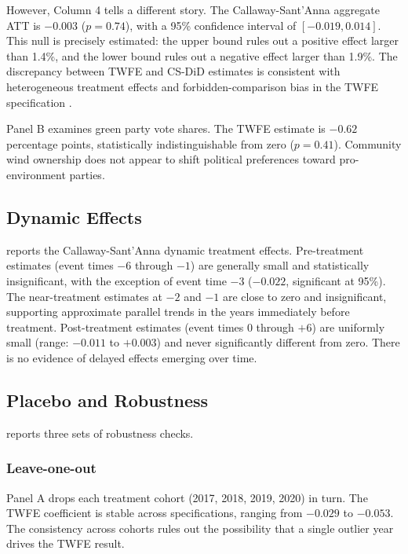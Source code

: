 \documentclass[12pt]{article}
\begin{document}
However, Column 4 tells a different story. The Callaway-Sant'Anna aggregate ATT is $-0.003$ ($p = 0.74$), with a 95\% confidence interval of $[-0.019, 0.014]$. This null is precisely estimated: the upper bound rules out a positive effect larger than 1.4\%, and the lower bound rules out a negative effect larger than 1.9\%. The discrepancy between TWFE and CS-DiD estimates is consistent with heterogeneous treatment effects and forbidden-comparison bias in the TWFE specification \citep{GoodmanBacon2021}.

Panel B examines green party vote shares. The TWFE estimate is $-0.62$ percentage points, statistically indistinguishable from zero ($p = 0.41$). Community wind ownership does not appear to shift political preferences toward pro-environment parties.



\subsection{Dynamic Effects}

 reports the Callaway-Sant'Anna dynamic treatment effects. Pre-treatment estimates (event times $-6$ through $-1$) are generally small and statistically insignificant, with the exception of event time $-3$ ($-0.022$, significant at 95\%). The near-treatment estimates at $-2$ and $-1$ are close to zero and insignificant, supporting approximate parallel trends in the years immediately before treatment. Post-treatment estimates (event times 0 through $+6$) are uniformly small (range: $-0.011$ to $+0.003$) and never significantly different from zero. There is no evidence of delayed effects emerging over time.



\subsection{Placebo and Robustness}

 reports three sets of robustness checks.

\subsubsection*{Leave-one-out} Panel A drops each treatment cohort (2017, 2018, 2019, 2020) in turn. The TWFE coefficient is stable across specifications, ranging from $-0.029$ to $-0.053$. The consistency across cohorts rules out the possibility that a single outlier year drives the TWFE result.
\end{document}
